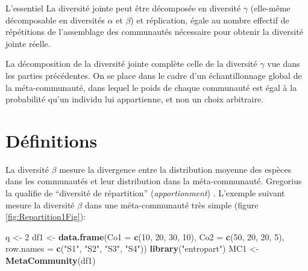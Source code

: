\documentclass[
  11pt,
  french,
  a4paper,
  extrafontsizes,onecolumn,openright
  ]{memoir}
\newenvironment{Shaded}{\begin{snugshade}}{\end{snugshade}}
\newcommand{\DataTypeTok}[1]{\textcolor[rgb]{0.13,0.29,0.53}{#1}}
\newcommand{\DecValTok}[1]{\textcolor[rgb]{0.00,0.00,0.81}{#1}}
\newcommand{\KeywordTok}[1]{\textcolor[rgb]{0.13,0.29,0.53}{\textbf{#1}}}
\newcommand{\NormalTok}[1]{#1}
\newcommand{\StringTok}[1]{\textcolor[rgb]{0.31,0.60,0.02}{#1}}
\newenvironment{Summary}
  {\begin{bclogo}[logo=\bctrombone, noborder=true, couleur=lightgray!50]{L'essentiel}\parindent0pt}
  {\end{bclogo}}
\begin{document}
\begin{Summary}
La diversité jointe peut être décomposée en diversité \(\gamma\)
(elle-même décomposable en diversités \(\alpha\) et \(\beta\)) et
réplication, égale au nombre effectif de répétitions de l'assemblage des
communautés nécessaire pour obtenir la diversité jointe réelle.
\end{Summary}

\normalsize

La décomposition de la diversité jointe \autocite{Gregorius2009a,Gregorius2010} complète celle de la diversité \(\gamma\) vue dans les parties précédentes.
On se place dans le cadre d'un échantillonnage global de la méta-communauté, dans lequel le poids de chaque communauté est égal à la probabilité qu'un individu lui appartienne, et non un choix arbitraire.

\hypertarget{sec-Definitions}{%
\section{Définitions}\label{sec-Definitions}}

La diversité \(\beta\) mesure la divergence entre la distribution moyenne des espèces dans les communautés et leur distribution dans la méta-communauté.
Gregorius la qualifie de \enquote{diversité de répartition} (\emph{apportionment}) \autocite{Gregorius2014}.
L'exemple suivant mesure la diversité \(\beta\) dans une méta-communauté très simple (figure \ref{fig:Repartition1Fig}):

\scriptsize

\begin{Shaded}
\begin{Highlighting}[]
\NormalTok{q <-}\StringTok{ }\DecValTok{2}
\NormalTok{df1 <-}\StringTok{ }\KeywordTok{data.frame}\NormalTok{(}\DataTypeTok{Co1 =} \KeywordTok{c}\NormalTok{(}\DecValTok{10}\NormalTok{, }\DecValTok{20}\NormalTok{, }\DecValTok{30}\NormalTok{, }\DecValTok{10}\NormalTok{), }\DataTypeTok{Co2 =} \KeywordTok{c}\NormalTok{(}\DecValTok{50}\NormalTok{, }\DecValTok{20}\NormalTok{, }\DecValTok{20}\NormalTok{,}
    \DecValTok{5}\NormalTok{), }\DataTypeTok{row.names =} \KeywordTok{c}\NormalTok{(}\StringTok{"S1"}\NormalTok{, }\StringTok{"S2"}\NormalTok{, }\StringTok{"S3"}\NormalTok{, }\StringTok{"S4"}\NormalTok{))}
\KeywordTok{library}\NormalTok{(}\StringTok{"entropart"}\NormalTok{)}
\NormalTok{MC1 <-}\StringTok{ }\KeywordTok{MetaCommunity}\NormalTok{(df1)}
\end{Highlighting}
\end{Shaded}
\end{document}
